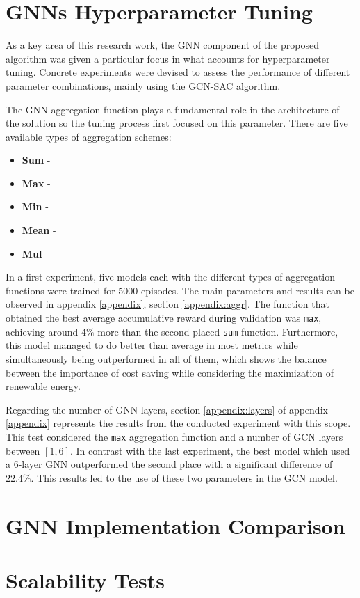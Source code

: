 \section{\acp{GNN} Hyperparameter Tuning} \label{sec:gnn-hypertune}

As a key area of this research work, the \ac{GNN} component of the proposed algorithm was given a particular focus in what accounts for hyperparameter tuning. Concrete experiments were devised to assess the performance of different parameter combinations, mainly using the GCN-SAC algorithm. \par

The \ac{GNN} aggregation function plays a fundamental role in the architecture of the solution so the tuning process first focused on this parameter. There are five available types of aggregation schemes:
\begin{itemize}
\item \textbf{Sum} - 
\item \textbf{Max} -
\item \textbf{Min} - 
\item \textbf{Mean} - 
\item \textbf{Mul} - 
\end{itemize}

\begin{comment}
	Validation episodes 295
	119 -> 83
\end{comment}
In a first experiment, five models each with the different types of aggregation functions were trained for 5000 episodes. The main parameters and results can be observed in appendix \ref{appendix}, section \ref{appendix:aggr}. The function that obtained the best average accumulative reward during validation was \texttt{max}, achieving around $4\%$ more than the second placed \texttt{sum} function. Furthermore, this model managed to do better than average in most metrics while simultaneously being outperformed in all of them, which shows the balance between the importance of cost saving while considering the maximization of renewable energy. \par

Regarding the number of \ac{GNN} layers, section \ref{appendix:layers} of appendix \ref{appendix} represents the results from the conducted experiment with this scope. This test considered the \texttt{max} aggregation function and a number of \ac{GCN} layers between $[1,6]$. In contrast with the last experiment, the best model which used a 6-layer \ac{GNN} outperformed the second place with a significant difference of $22.4\%$. This results led to the use of these two parameters in the \ac{GCN} model.




\section{GNN Implementation Comparison} \label{sec:gnn-comparison}

\section{Scalability Tests} \label{sec:scalability-tests}

